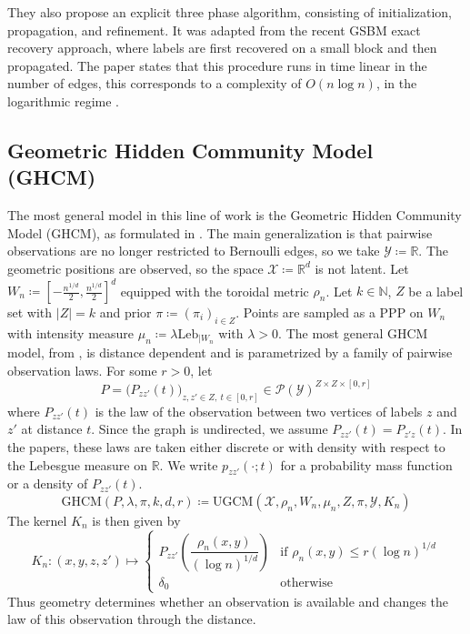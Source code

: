 \documentclass[runningheads]{llncs}
\begin{document}
They also propose an explicit three phase algorithm, consisting of initialization, propagation, and refinement. It was adapted from the recent GSBM exact recovery approach, where labels are first recovered on a small block and then propagated. The paper states that this procedure runs in time linear in the number of edges, this corresponds to a complexity of \(O(n\log n)\), in the logarithmic regime \citep{avrachenkov2026communitydetectionblockmodels}.


\subsection{Geometric Hidden Community Model (GHCM)}

The most general model in this line of work is the Geometric Hidden Community Model (GHCM), as formulated in \citep{gaudio2026exact}. The main generalization is that pairwise observations are no longer restricted to Bernoulli edges, so we take \(\mathcal Y \coloneqq \mathbb R\).
The geometric positions are observed, so the space \(\mathcal X \coloneq \mathbb{R}^d\) is not latent. Let \( W_n \coloneqq \left[-\frac{n^{1/d}}2,\frac{n^{1/d}}2\right]^d\) equipped with the toroidal metric \(\rho_n\). Let \(k\in\mathbb N\), \(Z\) be a label set with \(|Z|=k\) and prior \(\pi \coloneqq (\pi_i)_{i\in Z}\). Points are sampled as a PPP on \( W_n\) with intensity measure \(\mu_n \coloneqq \lambda \mathrm{Leb}_{\mid  W_n}\) with \(\lambda > 0\).
The most general GHCM model, from \citep{gaudio2026exact}, is distance dependent and is parametrized by a family of pairwise observation laws. For some \(r>0\), let
\[
P=\bigl(P_{zz'}(t)\bigr)_{z,z'\in Z,\ t\in[0,r]}\in \mathcal P(\mathcal Y)^{Z\times Z\times [0,r]}
\]
where \(P_{zz'}(t)\) is the law of the observation between two vertices of labels \(z\) and \(z'\) at distance \(t\). Since the graph is undirected, we assume \(P_{zz'}(t)=P_{z'z}(t)\). In the papers, these laws are taken either discrete or with density with respect to the Lebesgue measure on \(\mathbb R\). We write \(p_{zz'}(\cdot;t)\) for a probability mass function or a density of \(P_{zz'}(t)\).
\[
\mathrm{GHCM}(P,\lambda,\pi,k,d,r) \coloneqq \mathrm{UGCM}(\mathcal X,\rho_n,W_n,\mu_n,Z,\pi,\mathcal Y,K_n)
\]
The kernel \(K_n\) is then given by
\[
K_n : (x,y,z,z') \longmapsto
\begin{cases}
P_{zz'}\!\left(\dfrac{\rho_n(x,y)}{(\log n)^{1/d}}\right) & \text{if } \rho_n(x,y)\le r(\log n)^{1/d}\\
\delta_0 & \text{otherwise}
\end{cases}
\]
Thus geometry determines whether an observation is available and changes the law of this observation through the distance.
\end{document}
